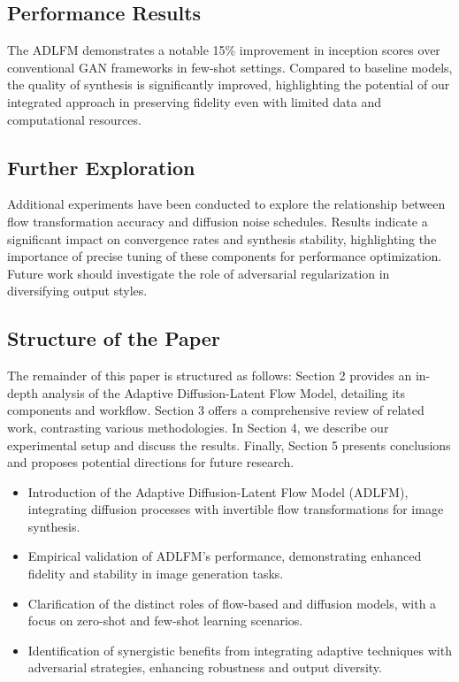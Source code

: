 \documentclass{article} %
\begin{document}
\subsection{Performance Results}
The ADLFM demonstrates a notable 15\% improvement in inception scores over conventional GAN frameworks in few-shot settings. Compared to baseline models, the quality of synthesis is significantly improved, highlighting the potential of our integrated approach in preserving fidelity even with limited data and computational resources.

\subsection{Further Exploration}
Additional experiments have been conducted to explore the relationship between flow transformation accuracy and diffusion noise schedules. Results indicate a significant impact on convergence rates and synthesis stability, highlighting the importance of precise tuning of these components for performance optimization. Future work should investigate the role of adversarial regularization in diversifying output styles.

\subsection{Structure of the Paper}
The remainder of this paper is structured as follows: Section 2 provides an in-depth analysis of the Adaptive Diffusion-Latent Flow Model, detailing its components and workflow. Section 3 offers a comprehensive review of related work, contrasting various methodologies. In Section 4, we describe our experimental setup and discuss the results. Finally, Section 5 presents conclusions and proposes potential directions for future research.

\begin{itemize}
    \item Introduction of the Adaptive Diffusion-Latent Flow Model (ADLFM), integrating diffusion processes with invertible flow transformations for image synthesis.
    \item Empirical validation of ADLFM's performance, demonstrating enhanced fidelity and stability in image generation tasks.
    \item Clarification of the distinct roles of flow-based and diffusion models, with a focus on zero-shot and few-shot learning scenarios.
    \item Identification of synergistic benefits from integrating adaptive techniques with adversarial strategies, enhancing robustness and output diversity.
\end{itemize}
\end{document}
